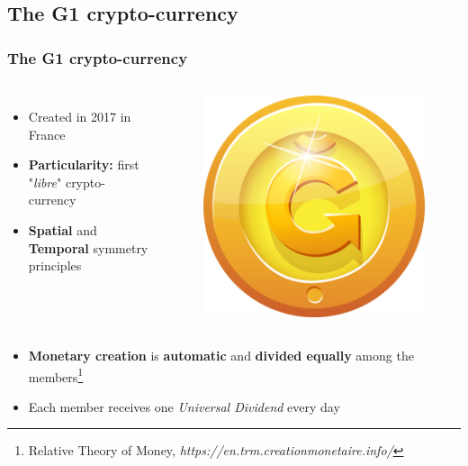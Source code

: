 \documentclass{beamer}
\begin{document}
\subsection{The G1 crypto-currency}


\begin{frame}
\frametitle{The G1 crypto-currency}

\begin{columns}[c]


\begin{itemize}
\item Created in 2017 in France
\item \textbf{Particularity:} first "\textit{libre}" crypto-currency
\item \textbf{Spatial} and \textbf{Temporal} symmetry principles
\end{itemize}

\begin{figure}
\includegraphics[width=.5\linewidth]{./figures/g1_logo}
\end{figure}

\end{columns}

\bigskip

\begin{itemize}
\item \textbf{Monetary creation} is \textbf{automatic} and \textbf{divided equally} among the members\footnote{Relative Theory of Money, \textit{https://en.trm.creationmonetaire.info/}}
\item Each member receives one \textit{Universal Dividend} every day
\end{itemize}


\end{frame}
\end{document}
